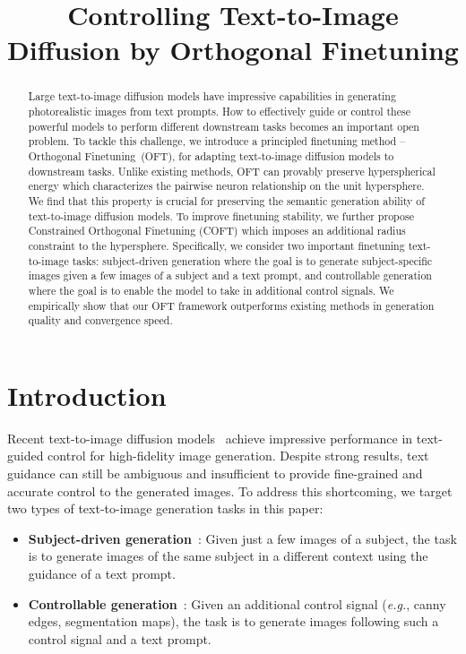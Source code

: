 \title{Controlling Text-to-Image Diffusion by Orthogonal Finetuning}

\begin{abstract}
Large text-to-image diffusion models have impressive capabilities in generating photorealistic images from text prompts. How to effectively guide or control these powerful models to perform different downstream tasks becomes an important open problem. To tackle this challenge, we introduce a principled finetuning method -- Orthogonal Finetuning~(OFT), for adapting text-to-image diffusion models to downstream tasks. Unlike existing methods, OFT can provably preserve hyperspherical energy which characterizes the pairwise neuron relationship on the unit hypersphere. We find that this property is crucial for preserving the semantic generation ability of text-to-image diffusion models. To improve finetuning stability, we further propose Constrained Orthogonal Finetuning (COFT) which imposes an additional radius constraint to the hypersphere. Specifically, we consider two important finetuning text-to-image tasks: subject-driven generation where the goal is to generate subject-specific images given a few images of a subject and a text prompt, and controllable generation where the goal is to enable the model to take in additional control signals. We empirically show that our OFT framework outperforms existing methods in generation quality and convergence speed.
\end{abstract}

\section{Introduction}

Recent text-to-image diffusion models~\cite{saharia2022photorealistic,ramesh2022hierarchical,rombach2022high} achieve impressive performance in text-guided control for high-fidelity image generation. Despite strong results, text guidance can still be ambiguous and insufficient to provide fine-grained and accurate control to the generated images. To address this shortcoming, we target two types of text-to-image generation tasks in this paper:

\begin{itemize}[leftmargin=*,nosep]

    \item \textbf{Subject-driven generation}~\cite{ruiz2023dreambooth}: Given just a few images of a subject, the task is to generate images of the same subject in a different context using the guidance of a text prompt.
    \item \textbf{Controllable generation}~\cite{zhang2023adding,mou2023t2i}: Given an additional control signal (\emph{e.g.}, canny edges, segmentation maps), the task is to generate images following such a control signal and a text prompt.
\end{itemize}

